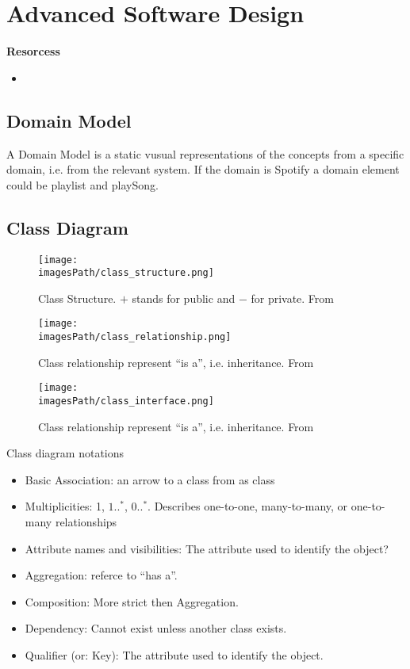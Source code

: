 \chapter{Advanced Software Design}


\textbf{Resorcess}
\begin{itemize}
    \item 
\end{itemize}

\section{Domain Model}
A Domain Model is a static vusual representations
of the concepts from a specific domain, i.e. from the relevant system.
If the domain is Spotify a domain element could be playlist and playSong.

\section{Class Diagram}
\begin{figure}[!h]
    \centering
    \texttt{[image: \\imagesPath/class\_structure.png]}
    \caption{Class Structure. $+$ stands for public and $-$ for private. From \cite{ASD3, p.3}}
\end{figure}
\begin{figure}[!h]
    \centering
    \texttt{[image: \\imagesPath/class\_relationship.png]}
    \caption{Class relationship represent ``is a'', i.e. inheritance. From \cite{ASD3, p.3}}
\end{figure}
\newpage
\begin{figure}[!h]
    \centering
    \texttt{[image: \\imagesPath/class\_interface.png]}
    \caption{Class relationship represent ``is a'', i.e. inheritance. From \cite{ASD3, p.3}}
\end{figure}

Class diagram notations
\begin{itemize}
  \item Basic Association: an arrow to a class from as class
  \item Multiplicities: 1, $1..^*$, $0..^*$. Describes one-to-one, many-to-many, or one-to-many
    relationships
  \item Attribute names and visibilities: The attribute used to identify the object?
  \item Aggregation: referce to ``has a''.
  \item Composition: More strict then Aggregation.
  \item Dependency: Cannot exist unless another class exists.
  \item Qualifier (or: Key): The attribute used to identify the object.
\end{itemize}

